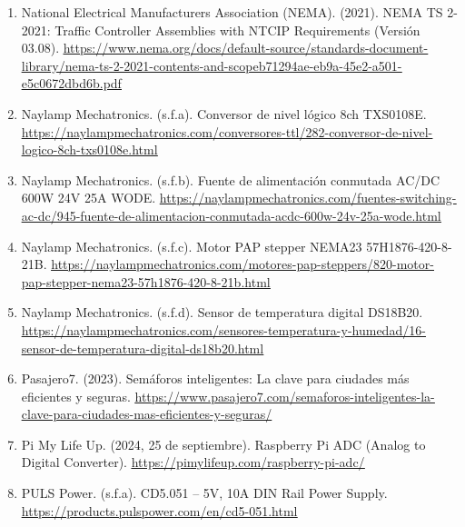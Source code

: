 \begin{enumerate}
\item
  National Electrical Manufacturers Association (NEMA). (2021). NEMA TS 2-2021: Traffic Controller Assemblies with NTCIP Requirements (Versión 03.08). \href{https://www.nema.org/docs/default-source/standards-document-library/nema-ts-2-2021-contents-and-scopeb71294ae-eb9a-45e2-a501-e5c0672dbd6b.pdf}{\ul{https://www.nema.org/docs/default-source/standards-document-library/nema-ts-2-2021-contents-and-scopeb71294ae-eb9a-45e2-a501-e5c0672dbd6b.pdf}}
\item
  Naylamp Mechatronics. (s.f.a). Conversor de nivel lógico 8ch TXS0108E. \href{https://naylampmechatronics.com/conversores-ttl/282-conversor-de-nivel-logico-8ch-txs0108e.html}{\ul{https://naylampmechatronics.com/conversores-ttl/282-conversor-de-nivel-logico-8ch-txs0108e.html}}
\item
  Naylamp Mechatronics. (s.f.b). Fuente de alimentación conmutada AC/DC 600W 24V 25A WODE. \href{https://naylampmechatronics.com/fuentes-switching-ac-dc/945-fuente-de-alimentacion-conmutada-acdc-600w-24v-25a-wode.html}{\ul{https://naylampmechatronics.com/fuentes-switching-ac-dc/945-fuente-de-alimentacion-conmutada-acdc-600w-24v-25a-wode.html}}
\item
  Naylamp Mechatronics. (s.f.c). Motor PAP stepper NEMA23 57H1876-420-8-21B. \href{https://naylampmechatronics.com/motores-pap-steppers/820-motor-pap-stepper-nema23-57h1876-420-8-21b.html}{\ul{https://naylampmechatronics.com/motores-pap-steppers/820-motor-pap-stepper-nema23-57h1876-420-8-21b.html}}
\item
  Naylamp Mechatronics. (s.f.d). Sensor de temperatura digital DS18B20. \href{https://naylampmechatronics.com/sensores-temperatura-y-humedad/16-sensor-de-temperatura-digital-ds18b20.html}{\ul{https://naylampmechatronics.com/sensores-temperatura-y-humedad/16-sensor-de-temperatura-digital-ds18b20.html}}
\item
  Pasajero7. (2023). Semáforos inteligentes: La clave para ciudades más eficientes y seguras. \href{https://www.pasajero7.com/semaforos-inteligentes-la-clave-para-ciudades-mas-eficientes-y-seguras/}{\ul{https://www.pasajero7.com/semaforos-inteligentes-la-clave-para-ciudades-mas-eficientes-y-seguras/}}
\item
  Pi My Life Up. (2024, 25 de septiembre). Raspberry Pi ADC (Analog to Digital Converter). \href{https://pimylifeup.com/raspberry-pi-adc/}{\ul{https://pimylifeup.com/raspberry-pi-adc/}}
\item
  PULS Power. (s.f.a). CD5.051 -- 5V, 10A DIN Rail Power Supply. \href{https://products.pulspower.com/en/cd5-051.html}{\ul{https://products.pulspower.com/en/cd5-051.html}}

\end{enumerate}
